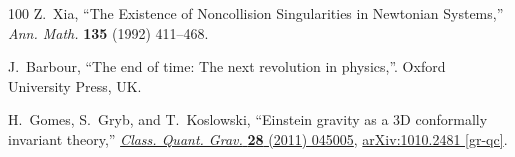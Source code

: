 \documentclass[prl,nofootinbib,twocolumn,superscriptaddress]{revtex4}
\begin{document}
\begin{thebibliography}{100}
Z.~Xia, ``The Existence of Noncollision Singularities in Newtonian Systems,''
  {\em Ann. Math.} {\bfseries 135} (1992) 411--468.

J.~Barbour, ``The end of time: The next revolution in physics,''. Oxford
  University Press, UK.

H.~Gomes, S.~Gryb, and T.~Koslowski, ``{Einstein gravity as a 3D conformally
  invariant theory},''
  \href{http://dx.doi.org/10.1088/0264-9381/28/4/045005}{{\em Class. Quant.
  Grav.} {\bfseries 28} (2011) 045005},
  \href{http://arxiv.org/abs/1010.2481}{{\ttfamily arXiv:1010.2481 [gr-qc]}}.

\end{thebibliography}
%
%
%
\end{document}
